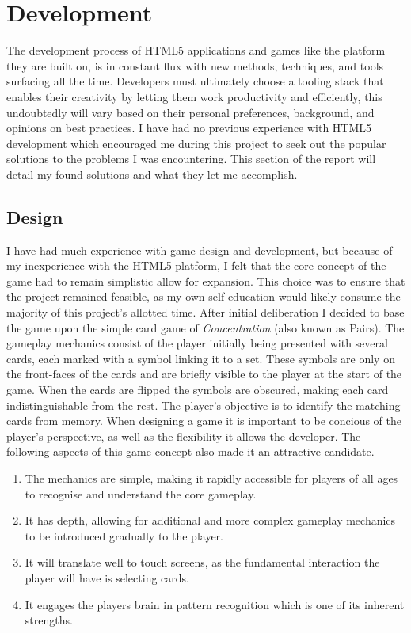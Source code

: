 \documentclass[final]{cmpreport}
\begin{document}
\section{Development}
The development process of HTML5 applications and games like the platform they are built on, is in constant flux with new methods, techniques, and tools surfacing all the time. Developers must ultimately choose a tooling stack that enables their creativity by letting them work productivity and efficiently, this undoubtedly will vary based on their personal preferences, background, and opinions on best practices. I have had no previous experience with HTML5 development which encouraged me during this project to seek out the popular solutions to the problems I was encountering. This section of the report will detail my found solutions and what they let me accomplish. 

\subsection{Design}
I have had much experience with game design and development, but because of my inexperience with the HTML5 platform, I felt that the core concept of the game had to remain simplistic allow for expansion. This choice was to ensure that the project remained feasible, as my own self education would likely consume the majority of this project's allotted time. After initial deliberation I decided to base the game upon the simple card game of \textit{Concentration\footnotemark} (also known as Pairs). The gameplay mechanics consist of the player initially being presented with several cards, each marked with a symbol linking it to a set. These symbols are only on the front-faces of the cards and are briefly visible to the player at the start of the game. When the cards are flipped the symbols are obscured, making each card indistinguishable from the rest. The player's objective is to identify the matching cards from memory. When designing a game it is important to be concious of the player's perspective, as well as the flexibility it allows the developer. The following aspects of this game concept also made it an attractive candidate.


\begin{enumerate}
  \item The mechanics are simple, making it rapidly accessible for players of all ages to recognise and understand the core gameplay.
  \item It has depth, allowing for additional and more complex gameplay mechanics to be introduced gradually to the player.
  \item It will translate well to touch screens, as the fundamental interaction the player will have is selecting cards.
  \item It engages the players brain in pattern recognition which is one of its inherent strengths.
\end{enumerate}
\end{document}
